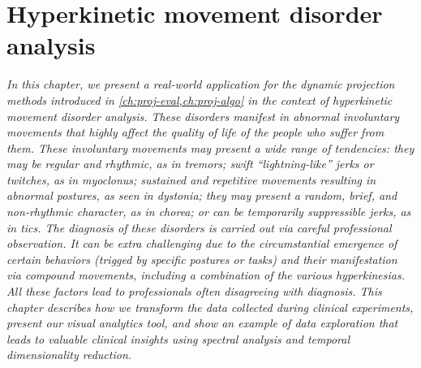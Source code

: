 \chapter{Hyperkinetic movement disorder analysis}
\label{ch:nemo}

\textit{
In this chapter, we present a real-world application for the dynamic projection methods introduced in \cref{ch:proj-eval,ch:proj-algo} in the context of hyperkinetic movement disorder analysis. These disorders manifest in abnormal involuntary movements that highly affect the quality of life of the people who suffer from them. These involuntary movements may present a wide range of tendencies: they may be regular and rhythmic, as in tremors; swift ``lightning-like'' jerks or twitches, as in myoclonus; sustained and repetitive movements resulting in abnormal postures, as seen in dystonia; they may present a random, brief, and non-rhythmic character, as in chorea; or can be temporarily suppressible jerks, as in tics.
The diagnosis of these disorders is carried out via careful professional observation. It can be extra challenging due to the circumstantial emergence of certain behaviors (trigged by specific postures or tasks) and their manifestation via compound movements, including a combination of the various hyperkinesias. All these factors lead to professionals often disagreeing with diagnosis. 
This chapter describes how we transform the data collected during clinical experiments, present our visual analytics tool, and show an example of data exploration that leads to valuable clinical insights using spectral analysis and temporal dimensionality reduction.
}

\vspace{5mm} %


